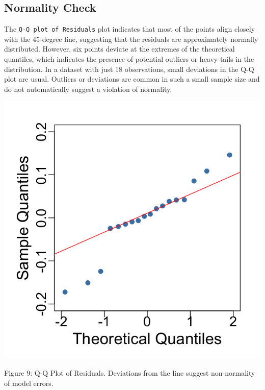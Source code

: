 \documentclass[
  12pt,
]{article}
\begin{document}
\vspace{-1em}

\subsection{Normality Check}\label{normality-check}

\noindent

\begin{minipage}{0.65\textwidth}
\justifying

The \texttt{Q-Q plot of Residuals} plot indicates that most of the points align closely with the 45-degree line, suggesting that the residuals are approximately normally distributed. However, six points deviate at the extremes of the theoretical quantiles, which indicates the presence of potential outliers or heavy tails in the distribution. In a dataset with just 18 observations, small deviations in the Q-Q plot are usual. Outliers or deviations are common in such a small sample size and do not automatically suggest a violation of normality.
\end{minipage}
\hfill
\begin{minipage}{0.33\textwidth}
\centering
\vspace{-2em}  %
\includegraphics[width=0.9\linewidth]{figures/qqplot_residuals.png}
\vspace{-1em}
\parbox{\linewidth}{\fontsize{12}{14}\selectfont Figure 9: Q-Q Plot of Residuals. Deviations from the line suggest non-normality of model errors.}

\end{minipage}
\end{document}

